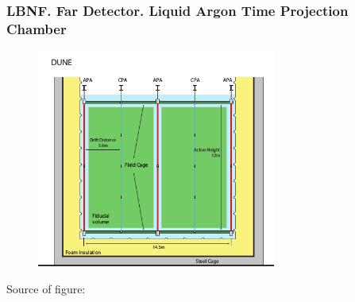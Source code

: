 \begin{frame}\frametitle{LBNF. Far Detector. Liquid Argon Time Projection Chamber}
\begin{figure}
\label{fig:farDetector_TPC}
\centering
\includegraphics[width=0.70\textwidth, keepaspectratio=true]{figs/farDetector_TPC.png}
\end{figure}
\tiny
Source of figure: \cite{ref_LBNFdoc_volume-detectors}
\end{frame}

